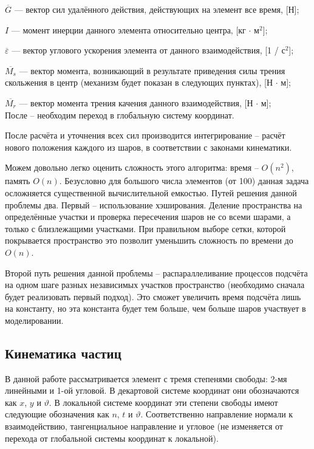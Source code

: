 \documentclass[utf8x, 14pt, oneside, a4paper]{article}
\begin{document}
$\overline{G}$ --- вектор сил удалённого действия, действующих на элемент все время, [Н];

$I$ --- момент инерции данного элемента относительно центра, [кг $ \cdot $ м$^2$];

$ \overline{\varepsilon}$ --- вектор углового ускорения элемента от данного взаимодействия, [1 / с$^2$];

$ \overline{M_s}$ --- вектор момента, возникающий в результате приведения силы трения скольжения в центр (механизм будет показан в следующих пунктах), [Н $ \cdot $ м];

$\overline{M_r}$ --- вектор момента трения качения данного взаимодействия, [Н $ \cdot $ м];
\\

После -- необходим переход в глобальную систему координат.

После расчёта и уточнения всех сил производится интегрирование -- расчёт нового положения каждого из шаров, в соответствии с законами кинематики.

Можем довольно легко оценить сложность этого алгоритма: время -- $O(n^2)$, память $O(n)$. 
Безусловно для большого числа элементов (от 100) данная задача осложняется существенной вычислительной емкостью.
Путей решения данной проблемы два.
Первый -- использование хэширования. 
Деление пространства на определённые участки и проверка пересечения шаров не со всеми шарами, а только с близлежащими участками.
При правильном выборе сетки, которой покрывается пространство это позволит уменьшить сложность по времени до $O(n)$.

Второй путь решения данной проблемы -- распараллеливание процессов подсчёта на одном шаге разных независимых участков пространство (необходимо сначала будет реализовать первый подход). Это сможет увеличить время подсчёта лишь на константу, но эта константа будет тем больше, чем больше шаров участвует в моделировании.


\subsection{Кинематика частиц}
\label{kinem_subsection}

В данной работе рассматривается элемент с тремя степенями свободы: 2-мя линейными и 1-ой угловой.
В декартовой системе координат они обозначаются как $x$, $y$ и $\vartheta$.
В локальной системе координат эти степени свободы имеют следующие обозначения как $n$, $t$ и $\vartheta$. Соответственно направление нормали к взаимодействию, тангенциальное направление и угловое (не изменяется от перехода от глобальной системы координат к локальной).
\end{document}
